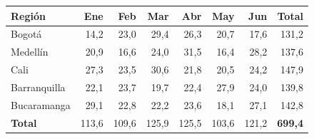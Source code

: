 \begin{tabularx}{\linewidth}{L r r r r r r r}
\toprule
Región & Ene & Feb & Mar & Abr & May & Jun & Total \\
\midrule
Bogotá & 14,2 & 23,0 & 29,4 & 26,3 & 20,7 & 17,6 & 131,2 \\
Medellín & 20,9 & 16,6 & 24,0 & 31,5 & 16,4 & 28,2 & 137,6 \\
Cali & 27,3 & 23,5 & 30,6 & 21,8 & 20,5 & 24,2 & 147,9 \\
Barranquilla & 22,1 & 23,7 & 19,7 & 22,4 & 27,9 & 24,0 & 139,8 \\
Bucaramanga & 29,1 & 22,8 & 22,2 & 23,6 & 18,1 & 27,1 & 142,8 \\
\midrule
\textbf{Total} & 113,6 & 109,6 & 125,9 & 125,5 & 103,6 & 121,2 & \textbf{699,4} \\
\bottomrule
\end{tabularx}
